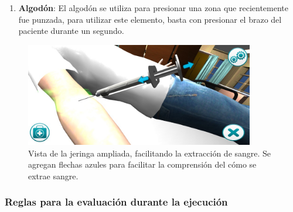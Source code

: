 \begin{itemize}
\begin{enumerate}
    A través de un menú contextual, se ofrece la posibilidad de realizar un
    acercamiento, como se observa en la figura~\ref{fig:hemocultivo_jeringa_zoom}, 
    en la vista ampliada, se puede realizar la extracción de sangre utilizando dos dedos, 
    con el primero se presiona el tambor y con el segundo dedo se extrae el émbolo\footnote{El
    tambor es la parte de la jeringa que almacena el fluido, mientras que el
    émbolo es la parte que se utiliza para presionar o succionar el fluido}.
    
\item \textbf{Algodón}: El algodón se utiliza para presionar una zona que
    recientemente fue punzada, para utilizar este elemento, basta con presionar
    el brazo del paciente durante un segundo.

\end{enumerate}


\begin{figure}[H]
\centering 
\includegraphics[width=10cm]{solucion/images/hemocultivo_jeringa_ampliada.jpg}
\caption{Vista de la jeringa ampliada, facilitando la extracción de sangre. Se
    agregan flechas azules para facilitar la comprensión del cómo se extrae
    sangre.}
\label{fig:hemocultivo_jeringa_zoom}
\end{figure}

\end{itemize}

\subsubsection{Reglas para la evaluación durante la ejecución}



